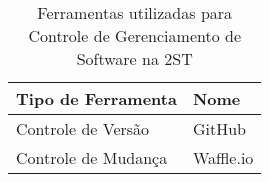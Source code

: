 \begin{table}[h!]
\centering
\caption{Ferramentas utilizadas para Controle de Gerenciamento de Software na 2ST}
\label{tabela-ferramentas}
\begin{tabular}{|l|l|}
\hline
Tipo de Ferramenta    & Nome \\ \hline
Controle de Versão     & GitHub     \\ \hline
Controle de Mudança       & Waffle.io     \\ \hline

\end{tabular}
\end{table}